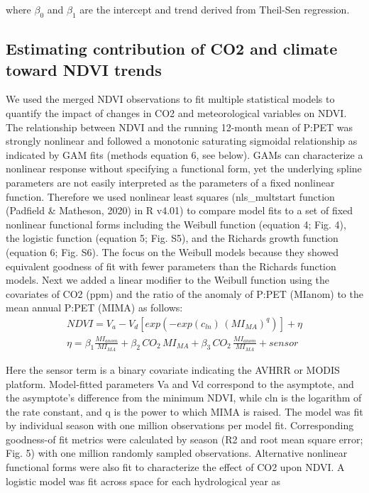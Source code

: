 \documentclass[gc, manuscript]{copernicus}
\begin{document}
where \(\beta_0\) and \(\beta_1\) are the intercept and trend derived
from Theil-Sen regression.

\subsection{Estimating contribution of CO2 and climate toward NDVI
trends}

We used the merged NDVI observations to fit multiple statistical models
to quantify the impact of changes in CO2 and meteorological variables on
NDVI. The relationship between NDVI and the running 12-month mean of
P:PET was strongly nonlinear and followed a monotonic saturating
sigmoidal relationship as indicated by GAM fits (methods equation 6, see
below). GAMs can characterize a nonlinear response without specifying a
functional form, yet the underlying spline parameters are not easily
interpreted as the parameters of a fixed nonlinear function. Therefore
we used nonlinear least squares (nls\_multstart function (Padfield \&
Matheson, 2020) in R v4.01) to compare model fits to a set of fixed
nonlinear functional forms including the Weibull function (equation 4;
Fig. 4), the logistic function (equation 5; Fig. S5), and the Richards
growth function (equation 6; Fig. S6). The focus on the Weibull models
because they showed equivalent goodness of fit with fewer parameters
than the Richards function models. Next we added a linear modifier to
the Weibull function using the covariates of CO2 (ppm) and the ratio of
the anomaly of P:PET (MIanom) to the mean annual P:PET (MIMA) as
follows: \begin{align}
NDVI=V_a-V_d[exp(-exp(c_{ln})\,(MI_{MA})^{q})]+\eta\\
\eta = \beta_{1}\frac{MI_{anom}}{MI_{MA}}+\beta_{2}\,CO_2\,MI_{MA} +\beta_{3}\,CO_2\,\frac{MI_{anom}}{MI_{MA}}+sensor\nonumber
\end{align}

Here the sensor term is a binary covariate indicating the AVHRR or MODIS
platform. Model-fitted parameters Va and Vd correspond to the asymptote,
and the asymptote's difference from the minimum NDVI, while cln is the
logarithm of the rate constant, and q is the power to which MIMA is
raised. The model was fit by individual season with one million
observations per model fit. Corresponding goodness-of fit metrics were
calculated by season (R2 and root mean square error; Fig. 5) with one
million randomly sampled observations. Alternative nonlinear functional
forms were also fit to characterize the effect of CO2 upon NDVI. A
logistic model was fit across space for each hydrological year as
\end{document}
